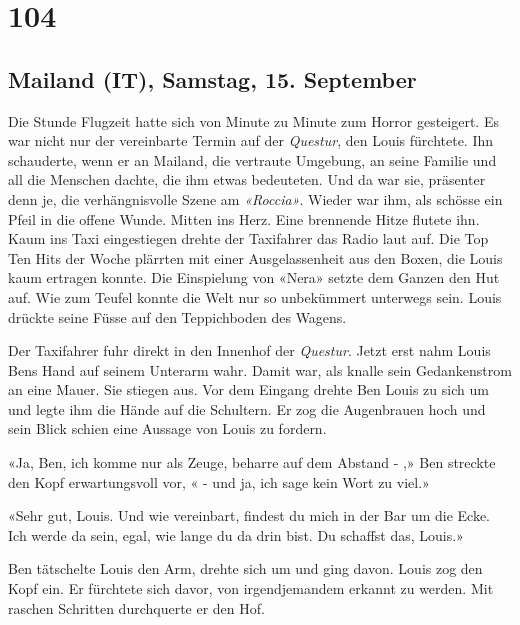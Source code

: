 \chapter{104}

\section{Mailand (IT), Samstag, 15.
September}



Die Stunde Flugzeit hatte sich von Minute zu Minute zum Horror
gesteigert. Es war nicht nur der vereinbarte Termin auf der \emph{Questur}, den
Louis fürchtete. Ihn schauderte, wenn er an Mailand, die vertraute
Umgebung, an seine Familie und all die Menschen dachte, die ihm etwas
bedeuteten. Und da war sie, präsenter denn je, die verhängnisvolle Szene am
\emph{«Roccia»}. Wieder war ihm, als schösse ein Pfeil in die offene
Wunde. Mitten ins Herz. Eine brennende Hitze flutete ihn. 
Kaum ins Taxi eingestiegen drehte der Taxifahrer das Radio laut auf. Die
Top Ten Hits der Woche plärrten mit einer Ausgelassenheit aus den Boxen,
die Louis kaum ertragen konnte. Die Einspielung von «Nera»
setzte dem Ganzen den Hut auf. Wie zum Teufel konnte die Welt nur so
unbekümmert unterwegs sein. Louis drückte seine Füsse auf den
Teppichboden des Wagens.


Der Taxifahrer fuhr direkt in den Innenhof der \emph{Questur}.
Jetzt erst nahm Louis Bens Hand auf seinem Unterarm wahr. Damit war, als
knalle sein Gedankenstrom an eine Mauer.
Sie stiegen aus.
Vor dem Eingang drehte Ben Louis zu sich um und legte ihm die Hände auf
die Schultern. Er zog die Augenbrauen hoch und sein Blick schien eine
Aussage von Louis zu fordern.

«Ja, Ben, ich komme nur als Zeuge, beharre auf dem Abstand - ,» Ben
streckte den Kopf erwartungsvoll vor, « - und ja, ich sage kein Wort zu
viel.»

«Sehr gut, Louis. Und wie vereinbart, findest du mich in der Bar um die
Ecke. Ich werde da sein, egal, wie lange du da drin bist. Du schaffst
das, Louis.»

Ben tätschelte Louis den Arm, drehte sich um und ging davon.
Louis zog den Kopf ein. Er fürchtete sich davor, von irgendjemandem
erkannt zu werden. Mit raschen Schritten durchquerte er den Hof.
